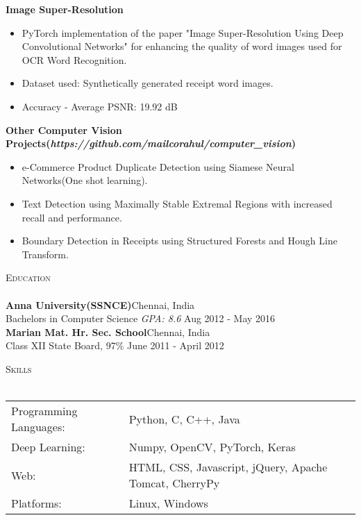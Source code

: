 \documentclass[a4paper]{article}
\newcommand{\lineunder} {
    \vspace*{-8pt} \\
    \hspace*{-18pt} \hrulefill \\
}
\newcommand{\header} [1] {
    {\hspace*{-18pt}\vspace*{6pt} \textsc{#1}}
    \vspace*{-6pt} \lineunder
}
\begin{document}
{\textbf{Image Super-Resolution}}\\
\begin{itemize}
    \itemsep-0.5em
    \item PyTorch implementation of the paper "Image Super-Resolution Using Deep Convolutional Networks" for enhancing the quality of word images used for OCR Word Recognition.
    \item Dataset used: Synthetically generated receipt word images.
    \item Accuracy - Average PSNR: 19.92 dB
\end{itemize}

\vspace*{2mm}
{\textbf{Other Computer Vision Projects(\textit{https://github.com/mailcorahul/computer\_vision})}}
    \begin{itemize}
        \itemsep-0.5em
        \item e-Commerce Product Duplicate Detection using Siamese Neural Networks(One shot learning).
        \item Text Detection using Maximally Stable Extremal Regions with increased recall and performance.
        \item Boundary Detection in Receipts using Structured Forests and Hough Line Transform.\\
    \end{itemize}

\header{Education}
\textbf{Anna University(SSNCE)}\hfill Chennai, India\\
Bachelor\textquotesingle{}s in Computer Science \textit{GPA: 8.6} \hfill Aug 2012 - May 2016\\
\vspace{2mm}
\textbf{Marian Mat. Hr. Sec. School}\hfill Chennai, India\\
Class XII State Board, 97\% \hfill June 2011 - April 2012\\
\vspace{2mm}

\header{Skills}
\begin{tabular}{ l l }
    Programming Languages: & Python, C, C++, Java                                   \\
    Deep Learning:         & Numpy, OpenCV, PyTorch, Keras                          \\
    Web:                   & HTML, CSS, Javascript, jQuery, Apache Tomcat, CherryPy \\
    Platforms:             & Linux, Windows                                         \\
\end{tabular}
\vspace{2mm}
\end{document}
